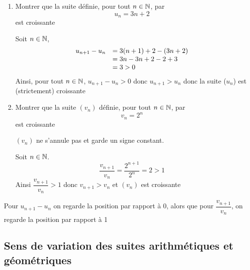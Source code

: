 \begin{exemples}
\begin{enumerate}
\item Montrer que la suite définie, pour tout $n\in\mathbb{N}$, par $$u_n = 3n+2$$ est croissante\newline

Soit $n\in\mathbb{N}$,
$$\begin{array}{l l}
u_{n+1} - u_n & = 3(n+1) + 2 - (3n+2)\\
& = 3n - 3n +2 -2 +3\\
& = 3 > 0 \\
\end{array}
$$
Ainsi, pour tout $n\in\mathbb{N}$, $u_{n+1} - u_n >0$ donc $u_{n+1} > u_n$ donc la suite ($u_n$) est (strictement) croissante
\item Montrer que la suite $(v_n)$ définie, pour tout $n\in\mathbb{N}$, par $$v_n = 2^n$$ est croissante\newline

$(v_n)$ ne s'annule pas et garde un signe constant. \newline

Soit $n\in\mathbb{N}$. 
$$\dfrac{v_{n+1}}{v_n} = \dfrac{2^{n+1}}{2^n} = 2 > 1$$
Ainsi 
$\dfrac{v_{n+1}}{v_n} >1$ donc $v_{n+1} > v_n$ et $(v_n)$ est croissante
\end{enumerate}
\end{exemples}
\begin{remarque}
Pour $u_{n+1} - u_n$ on regarde la position par rapport à 0, alors que pour $\dfrac{v_{n+1}}{v_n}$, on regarde la position par rapport à 1
\end{remarque}
\subsection{Sens de variation des suites arithmétiques et géométriques}
\newline

